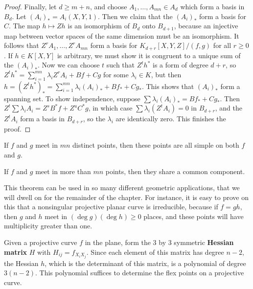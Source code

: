 \begin{proof}
    Finally, let $d \geq m + n$, and choose $A_1, \dots, A_{mn} \in A_d$ which form a basis in $B_d$. Let $(A_i)_* = A_i(X,Y,1)$. Then we claim that the $(A_i)_*$ form a basis for $C$. The map $h \mapsto Zh$ is an isomorphism of $B_d$ onto $B_{d+1}$, because an injective map between vector spaces of the same dimension must be an isomorphism. It follows that $Z^rA_1, \dots, Z^rA_{mn}$ form a basis for $K_{d+r}[X,Y,Z]/(f,g)$ for all $r \geq 0$. If $h \in K[X,Y]$ is arbitrary, we must show it is congruent to a unique sum of the $(A_i)_*$. Now we can choose $t$ such that $Z^th^*$ is a form of degree $d + r$, so $Z^th^* = \sum_{i = 1}^{mn} \lambda_i Z^rA_i + Bf + Cg$ for some $\lambda_i \in K$, but then $h = (Z^th^*)_* = \sum_{i = 1}^{mn} \lambda_i (A_i)_* + Bf_* + Cg_*$. This shows that $(A_i)_*$ form a spanning set. To show independence, suppose $\sum \lambda_i (A_i)_* = Bf_* + Cg_*$. Then $Z^t \sum \lambda_i A_i = Z^s B^*f + Z^u C^*g$, in which case $\sum \lambda_i (Z^t A_i) = 0$ in $B_{d+r}$, and the $Z^tA_i$ form a basis in $B_{d+r}$, so the $\lambda_i$ are identically zero. This finishes the proof.
\end{proof}

\begin{corollary}
    If $f$ and $g$ meet in $mn$ distinct points, then these points are all simple on both $f$ and $g$.
\end{corollary}

\begin{corollary}
    If $f$ and $g$ meet in more than $mn$ points, then they share a common component.
\end{corollary}

This theorem can be used in so many different geometric applications, that we will dwell on for the remainder of the chapter. For instance, it is easy to prove on this that a nonsingular projective planar curve is irreducible, because if $f = gh$, then $g$ and $h$ meet in $(\deg g)(\deg h) \geq 0$ places, and these points will have multiplicity greater than one.

Given a projective curve $f$ in the plane, form the 3 by 3 symmetric {\bf Hessian matrix} $H$ with $H_{ij} = f_{X_i X_j}$. Since each element of this matrix has degree $n-2$, the Hessian $h$, which is the determinant of this matrix, is a polynomial of degree $3(n-2)$. This polynomial suffices to determine the flex points on a projective curve.

